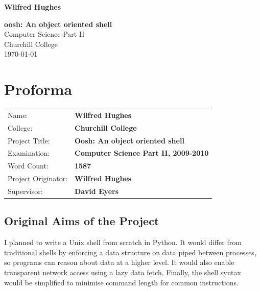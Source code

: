 \documentclass[12pt,twoside,notitlepage]{report}
\begin{document}





\pagestyle{empty}

\hfill{\LARGE \bf Wilfred Hughes}

\vspace*{60mm}
\begin{center}
\Huge
{\bf oosh: An object oriented shell} \\
\vspace*{5mm}
Computer Science Part II \\
\vspace*{5mm}
Churchill College \\
\vspace*{5mm}
\today  %
\end{center}

\cleardoublepage


\setcounter{page}{1}
\pagestyle{plain}

\chapter*{Proforma}

{\large
\begin{tabular}{ll}
Name:               & \bf Wilfred Hughes                       \\
College:            & \bf Churchill College                     \\
Project Title:      & \bf Oosh: An object oriented shell \\
Examination:        & \bf Computer Science Part II, 2009-2010        \\
Word Count:         & \bf 1587 \\
Project Originator: & \bf Wilfred Hughes                    \\
Supervisor:         & \bf David Eyers                    \\ 
\end{tabular}
}

\section*{Original Aims of the Project}
I planned to write a Unix shell from scratch in Python. It would
differ from traditional shells by enforcing a data structure on data piped
between processes, so programs can reason about data at a higher level. It would
also enable transparent network access using a lazy data fetch. Finally, the
shell syntax would be simplified to minimise command length for common
instructions.
\end{document}
